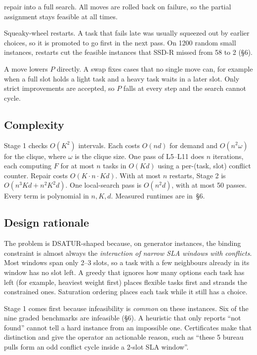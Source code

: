 \begin{description}
  repair into a full search. All moves are rolled back on failure, so the
  partial assignment stays feasible at all times.
\item[R1--R3] Squeaky-wheel restarts. A task that fails late was usually
  squeezed out by earlier choices, so it is promoted to go first in the
  next pass. On 1200 random small instances, restarts cut the feasible
  instances that SSD-R missed from 58 to 2 (\S6).
\item[L19--L20] A move lowers $P$ directly. A swap fixes cases that no
  single move can, for example when a full slot holds a light task and a
  heavy task waits in a later slot. Only strict improvements are accepted,
  so $P$ falls at every step and the search cannot cycle.
\end{description}

\subsection{Complexity}
Stage 1 checks $O(K^2)$ intervals. Each costs $O(nd)$ for demand and
$O(n^2\omega)$ for the clique, where $\omega$ is the clique size. One pass
of L5--L11 does $n$ iterations, each computing $F$ for at most $n$ tasks in
$O(Kd)$ using a per-(task, slot) conflict counter. Repair costs
$O(K\cdot n\cdot Kd)$. With at most $n$ restarts, Stage 2 is
$O(n^3Kd + n^2K^2d)$. One local-search pass is $O(n^2 d)$, with at most 50
passes. Every term is polynomial in $n, K, d$. Measured runtimes are
in~\S6.

\subsection{Design rationale}
The problem is DSATUR-shaped because, on generator instances, the binding
constraint is almost always the \emph{interaction of narrow SLA windows
with conflicts}. Most windows span only 2--3 slots, so a task with a few
neighbours already in its window has no slot left. A greedy that ignores
how many options each task has left (for example, heaviest weight first)
places flexible tasks first and strands the constrained ones. Saturation
ordering places each task while it still has a choice.

Stage 1 comes first because infeasibility is \emph{common} on these
instances. Six of the nine graded benchmarks are infeasible (\S6). A
heuristic that only reports ``not found'' cannot tell a hard instance from
an impossible one. Certificates make that distinction and give the
operator an actionable reason, such as ``these 5 bureau pulls form an odd
conflict cycle inside a 2-slot SLA window''.

